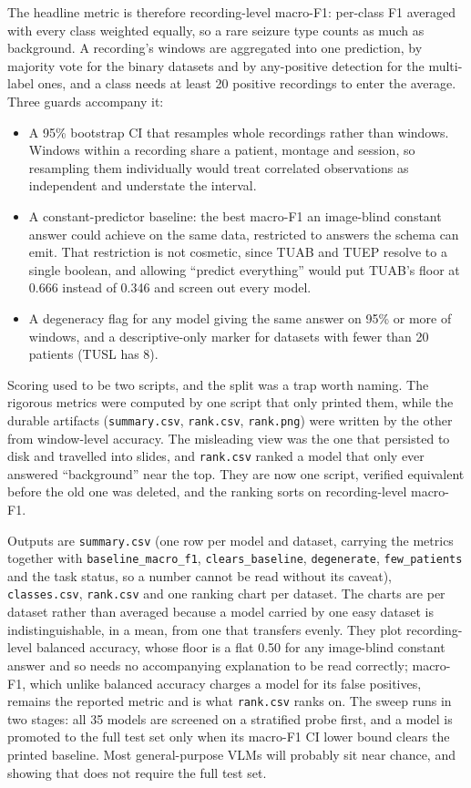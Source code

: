 \documentclass[11pt,a4paper]{article}
\newcommand{\file}[1]{{\small\texttt{#1}}}
\begin{document}
The headline metric is therefore recording-level macro-F1: per-class F1 averaged
with every class weighted equally, so a rare seizure type counts as much as
background. A recording's windows are aggregated into one prediction, by majority
vote for the binary datasets and by any-positive detection for the multi-label
ones, and a class needs at least 20 positive recordings to enter the average.
Three guards accompany it:

\begin{itemize}
\item A 95\% bootstrap CI that resamples whole recordings rather than windows.
      Windows within a recording share a patient, montage and session, so
      resampling them individually would treat correlated observations as
      independent and understate the interval.
\item A constant-predictor baseline: the best macro-F1 an image-blind constant
      answer could achieve on the same data, restricted to answers the schema can
      emit. That restriction is not cosmetic, since TUAB and TUEP resolve to a
      single boolean, and allowing ``predict everything'' would put TUAB's floor
      at 0.666 instead of 0.346 and screen out every model.
\item A degeneracy flag for any model giving the same answer on 95\% or more of
      windows, and a descriptive-only marker for datasets with fewer than 20
      patients (TUSL has 8).
\end{itemize}

Scoring used to be two scripts, and the split was a trap worth naming. The
rigorous metrics were computed by one script that only printed them, while the
durable artifacts (\file{summary.csv}, \file{rank.csv}, \file{rank.png}) were
written by the other from window-level accuracy. The misleading view was the one
that persisted to disk and travelled into slides, and \file{rank.csv} ranked a
model that only ever answered ``background'' near the top. They are now one
script, verified equivalent before the old one was deleted, and the ranking sorts
on recording-level macro-F1.

Outputs are \file{summary.csv} (one row per model and dataset, carrying the
metrics together with \texttt{baseline\_macro\_f1}, \texttt{clears\_baseline},
\texttt{degenerate}, \texttt{few\_patients} and the task status, so a number
cannot be read without its caveat), \file{classes.csv}, \file{rank.csv} and one
ranking chart per dataset. The charts are per dataset rather than averaged
because a model carried by one easy dataset is indistinguishable, in a mean, from
one that transfers evenly. They plot recording-level balanced accuracy, whose
floor is a flat 0.50 for any image-blind constant answer and so needs no
accompanying explanation to be read correctly; macro-F1, which unlike balanced
accuracy charges a model for its false positives, remains the reported metric and
is what \file{rank.csv} ranks on. The sweep runs in two stages: all 35 models are screened on a
stratified probe first, and a model is promoted to the full test set only when its
macro-F1 CI lower bound clears the printed baseline. Most general-purpose VLMs
will probably sit near chance, and showing that does not require the full test
set.
\end{document}

